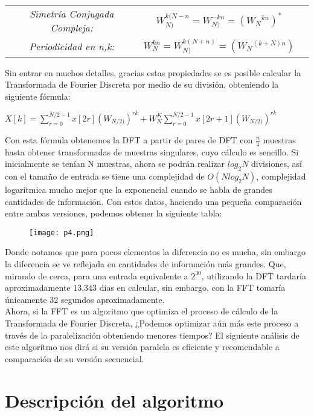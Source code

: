 \documentclass{article}
\begin{document}
\begin{center}
\begin{tabular}{ c c c }
 \textit{Simetría Conjugada Compleja:} & $W_{N)}^{k(N-n}=W_{N)}^{-kn}=(W{_{N}}^{kn})^{*}$\\ 
 \textit{Periodicidad en n,k:} & 
      $W_{N}^{kn}=W_{N)}^{k(N+n)}=(W{_{N}}^{(k+N)n})$  
\end{tabular}
\end{center}
Sin entrar en muchos detalles, gracias estas propiedades se es posible calcular la Transformada de Fourier Discreta por medio de su división, obteniendo la siguiente fórmula:\\
\begin{center}
    $X[k]=\sum_{r=0}^{N/2-1}x[2r](W_{N/2)})^{rk}+W_{N}^{K}\sum_{r=0}^{N/2-1}x[2r+1](W_{N/2)})^{rk}$
\end{center}
Con esta fórmula obtenemos la DFT a partir de pares de DFT con $\frac{n}{4}$ muestras hasta obtener transformadas de muestras singulares, cuyo cálculo es sencillo. Si inicialmente se tenían N muestras, ahora se podrán realizar $log_{2}N$ divisiones, así con el tamaño de entrada se tiene una complejidad de $O(Nlog_{2}N)$, complejidad logarítmica mucho mejor que la exponencial cuando se habla de grandes cantidades de información.
Con estos datos, haciendo una pequeña comparación entre ambas versiones, podemos obtener la siguiente tabla: 
\newpage

\begin{figure}[h]
\texttt{[image: p4.png]}
\end{figure}

Donde notamos que para pocos elementos la diferencia no es mucha, sin embargo la diferencia se ve reflejada en cantidades de información más grandes. Que, mirando de cerca, para una entrada equivalente a $2^{30}$, utilizando la DFT tardaría aproximadamente 13,343 días en calcular, sin embargo, con la FFT tomaría únicamente 32 segundos aproximadamente. \\

Ahora, si la FFT es un algoritmo que optimiza el proceso de cálculo de la Transformada de Fourier Discreta, ¿Podemos optimizar aún más este proceso a través de la paralelización obteniendo menores tiempos? El siguiente análisis de este algoritmo nos dirá si su versión paralela es eficiente y recomendable a comparación de su versión secuencial. 
\newpage
\section{Descripción del algoritmo}
\end{document}
